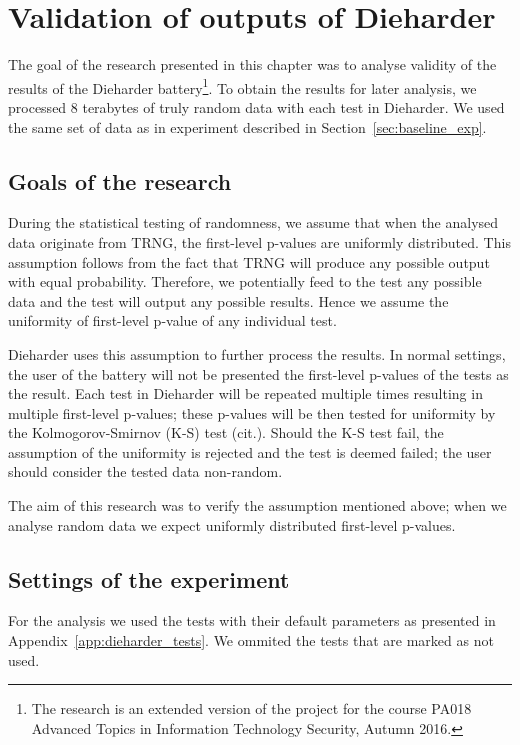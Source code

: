 \documentclass[
  digital,  	%
  color,		%
  oneside,   	%
  12pt,
  nocover,
  notable,
  nolof,
  nolot,
]{fithesis3}
\theoremstyle{definition}
\theoremstyle{remark}
\begin{document}
\chapter{Validation of outputs of Dieharder}
\label{chap:validating_dieharder}
The goal of the research presented in this chapter was to analyse validity of the results of the Dieharder battery\footnote{The research is an extended version of the project for the course PA018 Advanced Topics in Information Technology Security, Autumn 2016.}. To obtain the results for later analysis, we processed 8 terabytes of truly random data with each test in Dieharder. We used the same set of data as in experiment described in Section~\ref{sec:baseline_exp}.

\section{Goals of the research}
During the statistical testing of randomness, we assume that when the analysed data originate from TRNG, the first-level p-values are uniformly distributed. This assumption follows from the fact that TRNG will produce any possible output with equal probability. Therefore, we potentially feed to the test any possible data and the test will output any possible results. Hence we assume the uniformity of first-level p-value of any individual test.

Dieharder uses this assumption to further process the results. In normal settings, the user of the battery will not be presented the first-level p-values of the tests as the result. Each test in Dieharder will be repeated multiple times resulting in multiple first-level p-values; these p-values will be then tested for uniformity by the Kolmogorov-Smirnov (K-S) test (cit.). Should the K-S test fail, the assumption of the uniformity is rejected and the test is deemed failed; the user should consider the tested data non-random.

The aim of this research was to verify the assumption mentioned above; when we analyse random data we expect uniformly distributed first-level p-values.

\section{Settings of the experiment}
For the analysis we used the tests with their default parameters as presented in Appendix~\ref{app:dieharder_tests}. We ommited the tests that are marked as not used.
\end{document}
